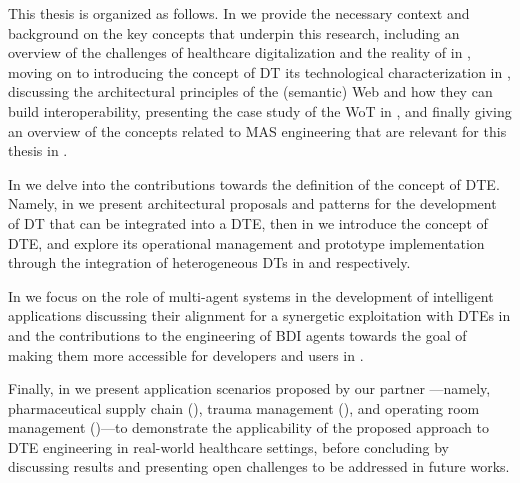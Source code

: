 This thesis is organized as follows. 
In  we provide the necessary context and background on the key concepts that underpin this research, including an overview of the challenges of healthcare digitalization and the reality of \ausl{} in ,
moving on to introducing the concept of \ac{DT} its technological characterization  in ,
discussing the architectural principles of the (semantic) Web and how they can build interoperability, presenting the case study of the \ac{WoT} in ,
and finally giving an overview of the concepts related to \ac{MAS} engineering that are relevant for this thesis in .

In  we delve into the contributions towards the definition of the concept of \ac{DTE}. Namely, in  we present architectural proposals and patterns for the development of \ac{DT} that can be integrated into a \ac{DTE}, then in  we introduce the concept of \ac{DTE}, and explore its operational management and prototype implementation through the integration of heterogeneous \acp{DT} in  and  respectively.

In  we focus on the role of multi-agent systems in the development of intelligent applications discussing their alignment for a synergetic exploitation with \acp{DTE} in  and the contributions to the engineering of \ac{BDI} agents towards the goal of making them more accessible for developers and users in .

Finally, in  we present application scenarios proposed by our partner \ausl{}---namely, pharmaceutical supply chain (), trauma management (), and operating room management ()---to demonstrate the applicability of the proposed approach to \ac{DTE} engineering in real-world healthcare settings,
before concluding by discussing results and presenting open challenges to be addressed in future works.